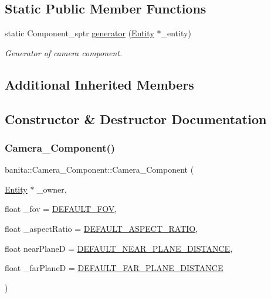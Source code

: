 \subsection*{Static Public Member Functions}
\begin{DoxyCompactItemize}
\item 
static Component\+\_\+sptr \mbox{\hyperlink{classbanita_1_1_camera___component_a91756a8ab968d38dae63a2c688d47221}{generator}} (\mbox{\hyperlink{classbanita_1_1_entity}{Entity}} $\ast$\+\_\+entity)
\begin{DoxyCompactList}\small\item\em Generator of camera component. \end{DoxyCompactList}\end{DoxyCompactItemize}
\subsection*{Additional Inherited Members}


\subsection{Constructor \& Destructor Documentation}
\mbox{\label{classbanita_1_1_camera___component_a5fcebd13ad636d4973e257ac3b4d7e84}} 
\subsubsection{\texorpdfstring{Camera\_Component()}{Camera\_Component()}}
{\footnotesize\ttfamily banita\+::\+Camera\+\_\+\+Component\+::\+Camera\+\_\+\+Component (\begin{DoxyParamCaption}\item[{\mbox{\hyperlink{classbanita_1_1_entity}{Entity}} $\ast$}]{\+\_\+owner,  }\item[{float}]{\+\_\+fov = {\ttfamily \mbox{\hyperlink{_camera___component_8hpp_ab45bec6fad4f0c516372be64fcca1d73}{D\+E\+F\+A\+U\+L\+T\+\_\+\+F\+OV}}},  }\item[{float}]{\+\_\+aspect\+Ratio = {\ttfamily \mbox{\hyperlink{_camera___component_8hpp_a1417cf7e68d22784246127e2aee342de}{D\+E\+F\+A\+U\+L\+T\+\_\+\+A\+S\+P\+E\+C\+T\+\_\+\+R\+A\+T\+IO}}},  }\item[{float}]{near\+PlaneD = {\ttfamily \mbox{\hyperlink{_camera___component_8hpp_a643eaef95c75256d77bea146114eeb7c}{D\+E\+F\+A\+U\+L\+T\+\_\+\+N\+E\+A\+R\+\_\+\+P\+L\+A\+N\+E\+\_\+\+D\+I\+S\+T\+A\+N\+CE}}},  }\item[{float}]{\+\_\+far\+PlaneD = {\ttfamily \mbox{\hyperlink{_camera___component_8hpp_a55c2ae8ef286b359ae10964104b25836}{D\+E\+F\+A\+U\+L\+T\+\_\+\+F\+A\+R\+\_\+\+P\+L\+A\+N\+E\+\_\+\+D\+I\+S\+T\+A\+N\+CE}}} }\end{DoxyParamCaption})}



